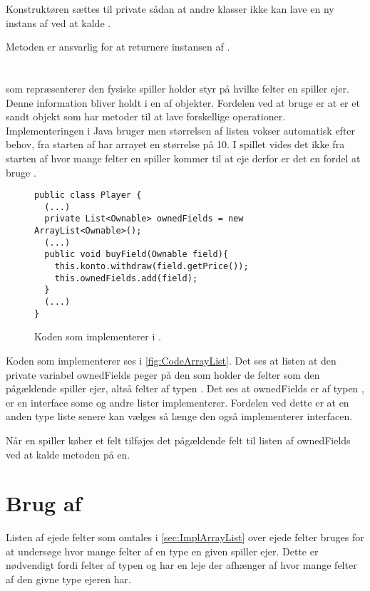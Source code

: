 Konstruktøren sættes til private sådan at andre klasser ikke kan lave en ny instans af  ved at kalde .

Metoden  er ansvarlig for at returnere instansen af .

\section{}\label{sec:ImplArrayList}
 som repræsenterer den fysiske spiller holder styr på hvilke felter en spiller ejer. Denne information bliver holdt i en  af  objekter. Fordelen ved at bruge  er at  er et sandt objekt som har metoder til at lave forskellige operationer. Implementeringen i Java bruger  men størrelsen af listen vokser automatisk efter behov, fra starten af har arrayet en størrelse på 10. I spillet vides det ikke fra starten af hvor mange felter en spiller kommer til at eje derfor er det en fordel at bruge .\cite{headfirstjava}

\begin{figure}
\caption{Koden som implementerer  i .}
\label{fig:CodeArrayList}
\centering
\begin{lstlisting}
public class Player {
  (...)
  private List<Ownable> ownedFields = new ArrayList<Ownable>();
  (...)
  public void buyField(Ownable field){
    this.konto.withdraw(field.getPrice());	
    this.ownedFields.add(field);
  }
  (...)
}
\end{lstlisting}
\end{figure}

Koden som implementerer  ses i \vref{fig:CodeArrayList}. Det ses at listen at den private variabel ownedFields peger på den  som holder de felter som den pågældende spiller ejer, altså felter af typen . Det ses at ownedFields er af typen ,  er en interface some  og andre lister implementerer. Fordelen ved dette er at en anden type liste senere kan vælges så længe den også implementerer  interfacen.\cite{javaUtilList}

Når en spiller køber et felt tilføjes det pågældende felt til listen af ownedFields ved at kalde metoden  på en.



\section{Brug af }
Listen af ejede felter som omtales i \vref{sec:ImplArrayList} over ejede felter bruges for at undersøge hvor mange felter af en type en given spiller ejer. Dette er nødvendigt fordi felter af typen  og  har en leje der afhænger af hvor mange felter af den givne type ejeren har.

